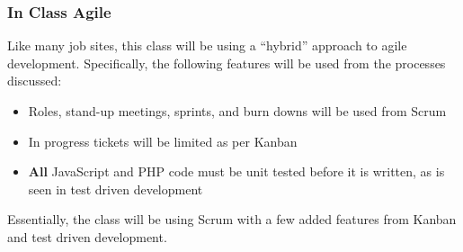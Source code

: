 \documentclass[aspectratio=169]{beamer}
\begin{document}
\begin{frame}
\frametitle{In Class Agile}
Like many job sites, this class will be using a ``hybrid'' approach to agile development. Specifically, the following features will be used from the processes discussed:
\begin{itemize}
	\item Roles, stand-up meetings, sprints, and burn downs will be used from Scrum
	\item In progress tickets will be limited as per Kanban
	\item \textbf{All} JavaScript and PHP code must be unit tested before it is written, as is seen in test driven development
\end{itemize}
Essentially, the class will be using Scrum with a few added features from Kanban and test driven development.
\end{frame}
\end{document}
